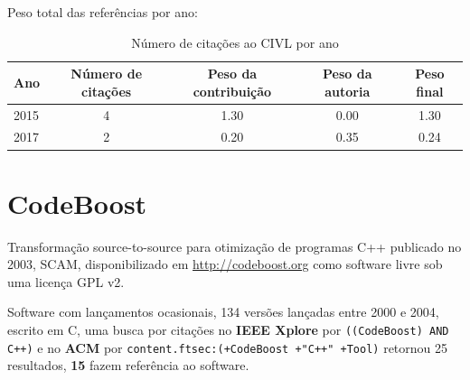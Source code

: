 Peso total das referências por ano:

\begin{table}[h]
\caption{Número de citações ao CIVL  por ano}
\centering
\begin{tabular}{| l | c | c | c | c |}
  \hline
  Ano & Número de citações & Peso da contribuição & Peso da autoria & Peso final \\
  \hline
  2015
    & 4
    & 1.30
    & 0.00
    & 1.30 \\
  2017
    & 2
    & 0.20
    & 0.35
    & 0.24 \\
  \hline
\end{tabular}
\end{table}


\section{CodeBoost}

Transformação source-to-source para otimização de programas C++
publicado no 2003, SCAM,
disponibilizado em \url{http://codeboost.org}
como software livre
sob uma licença GPL v2.

Software com lançamentos ocasionais,
134 versões lançadas
entre 2000 e 2004,
escrito em C,
uma busca por citações no {\bf IEEE Xplore} por
\texttt{((CodeBoost) AND C++)}
e no {\bf ACM} por
\texttt{content.ftsec:(+CodeBoost +"C++" +Tool)}
retornou
25 resultados,
{\bf 15} fazem referência ao software.

